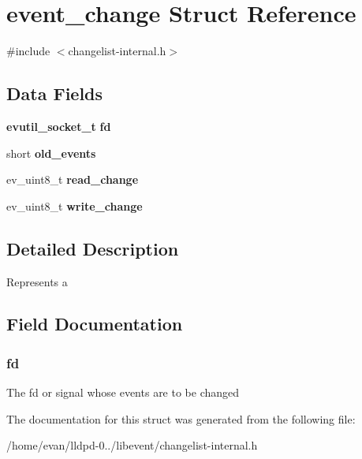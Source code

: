 \section{event\-\_\-change \-Struct \-Reference}
\label{structevent__change}


{\ttfamily \#include $<$changelist-\/internal.\-h$>$}

\subsection*{\-Data \-Fields}
\begin{DoxyCompactItemize}
\item 
{\bf evutil\-\_\-socket\-\_\-t} {\bf fd}
\item 
short {\bfseries old\-\_\-events}\label{structevent__change_a0513cefee1cad36da4c45cbfe78e7b53}

\item 
ev\-\_\-uint8\-\_\-t {\bfseries read\-\_\-change}\label{structevent__change_af370577fbf53f006440bbf1551e9460b}

\item 
ev\-\_\-uint8\-\_\-t {\bfseries write\-\_\-change}\label{structevent__change_a057c4b752d514057af06320aafb76f53}

\end{DoxyCompactItemize}


\subsection{\-Detailed \-Description}
\-Represents a 

\subsection{\-Field \-Documentation}
\subsubsection[{fd}]{ {\bf fd}}\label{structevent__change_adf76ebacdedde5572e9ba938beab2afe}
\-The fd or signal whose events are to be changed 

\-The documentation for this struct was generated from the following file\-:\begin{DoxyCompactItemize}
\item 
/home/evan/lldpd-\/0../libevent/changelist-\/internal.\-h\end{DoxyCompactItemize}
